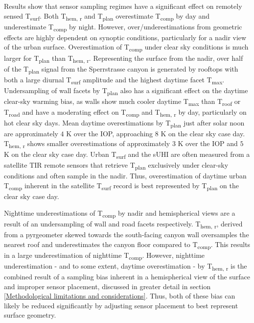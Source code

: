 Results show that sensor sampling regimes have a significant effect on remotely sensed T\textsubscript{surf}. Both T\textsubscript{hem, r} and T\textsubscript{plan} overestimate T\textsubscript{comp} by day and underestimate T\textsubscript{comp} by night. However, over/underestimations from geometric effects are highly dependent on synoptic conditions, particularly for a nadir view of the urban surface. Overestimation of T\textsubscript{comp} under clear sky conditions is much larger for T\textsubscript{plan} than T\textsubscript{hem, r}. Representing the surface from the nadir, over half of the T\textsubscript{plan} signal from the Sperrstrasse canyon is generated by rooftops with both a large diurnal T\textsubscript{surf} amplitude and the highest daytime facet T\textsubscript{max}. Undersampling of wall facets by T\textsubscript{plan} also has a significant effect on the daytime clear-sky warming bias, as walls show much cooler daytime T\textsubscript{max} than T\textsubscript{roof} or T\textsubscript{road} and have a moderating effect on T\textsubscript{comp} and T\textsubscript{hem, r} by day, particularly on hot clear sky days. Mean daytime overestimations by T\textsubscript{plan} just after solar noon are approximately $4$ \si{K} over the IOP, approaching $8$ \si{K} on the clear sky case day. T\textsubscript{hem, r} shows smaller overestimations of approximately $3$ \si{K} over the IOP and $5$ \si{K} on the clear sky case day. Urban T\textsubscript{surf} and the sUHI are often measured from a satellite TIR remote sensors that retrieve T\textsubscript{plan} exclusively under clear-sky conditions and often sample in the nadir. Thus, overestimation of daytime urban T\textsubscript{comp} inherent in the satellite T\textsubscript{surf} record is best represented by T\textsubscript{plan} on the clear sky case day. 

Nighttime underestimations of T\textsubscript{comp} by nadir and hemispherical views are a result of an undersampling of wall and road facets respectively. T\textsubscript{hem, r}, derived from a pyrgeometer skewed towards the south-facing canyon wall oversamples the nearest roof and underestimates the canyon floor compared to T\textsubscript{comp}. This results in a large underestimation of nighttime T\textsubscript{comp}. However, nighttime underestimation - and to some extent, daytime overestimation - by T\textsubscript{hem, r} is the combined result of a sampling bias inherent in a hemispherical view of the surface and improper sensor placement, discussed in greater detail in section \ref{Methodological limitations and considerations}. Thus, both of these bias can likely be reduced significantly by adjusting sensor placement to best represent surface geometry. 

